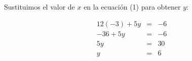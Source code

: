 \documentclass[12pt,addpoints,answers]{repaso}
\begin{document}
\begin{questions}
{\begin{solutionbox}{11.5cm}
            Sustituimos el valor de $x$ en la ecuación (1) para obtener $y$:

            \begin{eqnarray}
                12(-3) + 5y & = & -6 \nonumber\\
                -36 + 5y & = & -6 \nonumber\\
                5y & = & 30 \nonumber\\
                y & = & 6 \nonumber
            \end{eqnarray}
        \end{solutionbox}
    }

\end{questions}
\end{document}

